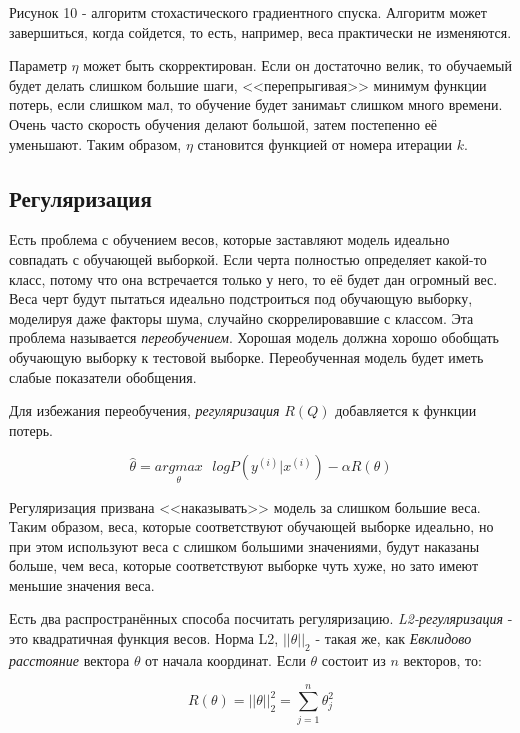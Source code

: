 \documentclass[a4paper,12pt,preview]{report} %
\begin{document}
	\begin{center}
		Рисунок 10 - алгоритм стохастического градиентного спуска. Алгоритм может завершиться, когда сойдется, то есть, например, веса практически не изменяются.
	\end{center}
	
	Параметр $\eta$ может быть скорректирован. Если он достаточно велик, то обучаемый будет делать слишком большие шаги, <<перепрыгивая>> минимум функции потерь, если слишком мал, то обучение будет занимаьт слишком много времени. Очень часто скорость обучения делают большой, затем постепенно её уменьшают. Таким образом, $\eta$ становится функцией от номера итерации $k$.
	
	\subsection{Регуляризация}
	
	Есть проблема с обучением весов, которые заставляют модель идеально совпадать с обучающей выборкой. Если черта полностью определяет какой-то класс, потому что она встречается только у него, то её будет дан огромный вес. Веса черт будут пытаться идеально подстроиться под обучающую выборку, моделируя даже факторы шума, случайно скоррелировавшие с классом. Эта проблема называется \textit{переобучением}. Хорошая модель должна хорошо обобщать обучающую выборку к тестовой выборке. Переобученная модель будет иметь слабые показатели обобщения.
	
	Для избежания переобучения, \textit{регуляризация} $R(Q)$ добавляется к функции потерь.
	
	\begin{equation}
	\hat{\theta} = \underset{\theta}{argmax} \text{ } logP(y^{(i)} | x^{(i)}) - \alpha R(\theta)
	\end{equation}
	
	Регуляризация призвана <<наказывать>> модель за слишком большие веса. Таким образом, веса, которые соответствуют обучающей выборке идеально, но при этом используют веса с слишком большими значениями, будут наказаны больше, чем веса, которые соответствуют выборке чуть хуже, но зато имеют меньшие значения веса. 
	
	Есть два распространённых способа посчитать регуляризацию. \textit{L2-регуляризация} - это квадратичная функция весов. Норма L2, $||\theta||_2$ - такая же, как \textit{Евклидово расстояние} вектора $\theta$ от начала координат. Если $\theta$ состоит из $n$ векторов, то:
	
	\begin{equation}
	R(\theta) = ||\theta||_2^2 = \sum_{j=1}^{n} \theta_j^2
	\end{equation}
	
\end{document}
